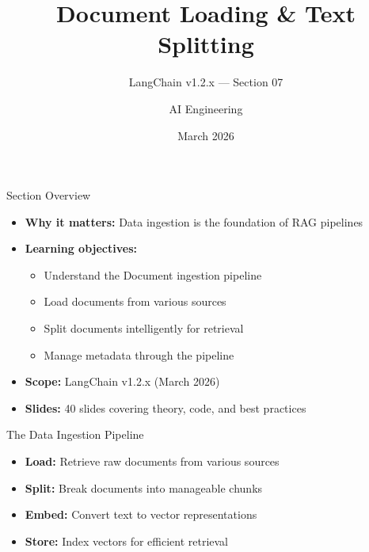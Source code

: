 \documentclass[aspectratio=169,11pt]{beamer}
\title{Document Loading \& Text Splitting}
\subtitle{LangChain v1.2.x --- Section 07}
\author{AI Engineering}
\date{March 2026}
\begin{document}
\begin{frame}
  \titlepage
\end{frame}

\begin{frame}{Section Overview}
  \begin{itemize}
    \setlength{\itemsep}{1pt}
    \item \textbf{Why it matters:} Data ingestion is the foundation of RAG pipelines
    \item \textbf{Learning objectives:}
    \begin{itemize}
    \setlength{\itemsep}{1pt}
      \item Understand the Document ingestion pipeline
      \item Load documents from various sources
      \item Split documents intelligently for retrieval
      \item Manage metadata through the pipeline
    \end{itemize}
    \item \textbf{Scope:} LangChain v1.2.x (March 2026)
    \item \textbf{Slides:} 40 slides covering theory, code, and best practices
  \end{itemize}
\end{frame}

\begin{frame}{The Data Ingestion Pipeline}

  \vspace{1.5cm}
  \begin{itemize}
    \setlength{\itemsep}{1pt}
    \item \textbf{Load:} Retrieve raw documents from various sources
    \item \textbf{Split:} Break documents into manageable chunks
    \item \textbf{Embed:} Convert text to vector representations
    \item \textbf{Store:} Index vectors for efficient retrieval
  \end{itemize}
\end{frame}
\end{document}
